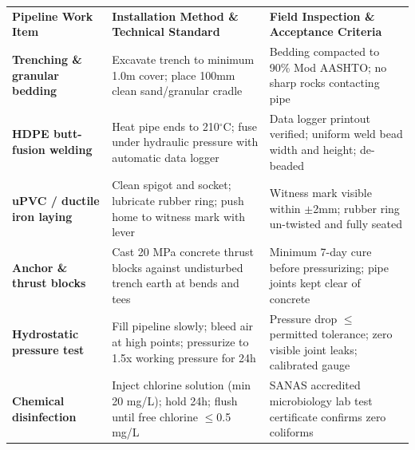 \documentclass[a4paper,11pt]{article}
\begin{document}
{\fontsize{7.7pt}{9.8pt}\selectfont
\renewcommand{\arraystretch}{1.23}
\noindent
\begin{tabularx}{\textwidth}{@{}p{3.3cm} p{6.6cm} X@{}}
\rowcolor{mhnavy}
{\color{white}\bfseries Pipeline Work Item} & {\color{white}\bfseries Installation Method \& Technical Standard} & {\color{white}\bfseries Field Inspection \& Acceptance Criteria} \\
\rowcolor{mhbluelight}
\bfseries Trenching \& granular bedding & Excavate trench to minimum 1.0m cover; place 100mm clean sand/granular cradle & Bedding compacted to 90\% Mod AASHTO; no sharp rocks contacting pipe \\
\bfseries HDPE butt-fusion welding & Heat pipe ends to 210$^\circ$C; fuse under hydraulic pressure with automatic data logger & Data logger printout verified; uniform weld bead width and height; de-beaded \\
\rowcolor{mhbluelight}
\bfseries uPVC / ductile iron laying & Clean spigot and socket; lubricate rubber ring; push home to witness mark with lever & Witness mark visible within $\pm$2mm; rubber ring un-twisted and fully seated \\
\bfseries Anchor \& thrust blocks & Cast 20 MPa concrete thrust blocks against undisturbed trench earth at bends and tees & Minimum 7-day cure before pressurizing; pipe joints kept clear of concrete \\
\rowcolor{mhbluelight}
\bfseries Hydrostatic pressure test & Fill pipeline slowly; bleed air at high points; pressurize to 1.5x working pressure for 24h & Pressure drop $\le$ permitted tolerance; zero visible joint leaks; calibrated gauge \\
\bfseries Chemical disinfection & Inject chlorine solution (min 20 mg/L); hold 24h; flush until free chlorine $\le$0.5 mg/L & SANAS accredited microbiology lab test certificate confirms zero coliforms \\
\end{tabularx}
\renewcommand{\arraystretch}{1}
}

\vfill
\end{document}
